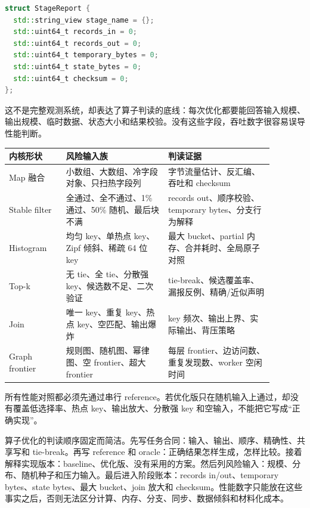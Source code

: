 \begin{lstlisting}[language=C++,caption={阶段报告的最小字段}]
struct StageReport {
  std::string_view stage_name = {};
  std::uint64_t records_in = 0;
  std::uint64_t records_out = 0;
  std::uint64_t temporary_bytes = 0;
  std::uint64_t state_bytes = 0;
  std::uint64_t checksum = 0;
};
\end{lstlisting}

这不是完整观测系统，却表达了算子判读的底线：每次优化都要能回答输入规模、输出规模、临时数据、状态大小和结果校验。没有这些字段，吞吐数字很容易误导性能判断。

\begin{center}
\begin{tabular}{p{0.19\linewidth}p{0.34\linewidth}p{0.35\linewidth}}
\toprule
内核形状 & 风险输入族 & 判读证据 \\
\midrule
Map 融合 & 小数组、大数组、冷字段对象、只扫热字段列 & 字节流量估计、反汇编、吞吐和 checksum \\
Stable filter & 全通过、全不通过、1\% 通过、50\% 随机、最后块不满 & records out、顺序校验、temporary bytes、分支行为解释 \\
Histogram & 均匀 key、单热点 key、Zipf 倾斜、稀疏 64 位 key & 最大 bucket、partial 内存、合并耗时、全局原子对照 \\
Top-k & 无 tie、全 tie、分散强 key、候选数不足、二次验证 & tie-break、候选覆盖率、漏报反例、精确/近似声明 \\
Join & 唯一 key、重复 key、热点 key、空匹配、输出爆炸 & key 频次、输出上界、实际输出、背压策略 \\
Graph frontier & 规则图、随机图、幂律图、空 frontier、超大 frontier & 每层 frontier、边访问数、重复发现数、worker 空闲时间 \\
\bottomrule
\end{tabular}
\end{center}

\begin{warningbox}
所有性能对照都必须先通过串行 reference。若优化版只在随机输入上通过，却没有覆盖低选择率、热点 key、输出放大、分散强 key 和空输入，不能把它写成“正确实现”。
\end{warningbox}

算子优化的判读顺序固定而简洁。先写任务合同：输入、输出、顺序、精确性、共享写和 tie-break。再写 reference 和 oracle：正确结果怎样生成，怎样比较。接着解释实现版本：baseline、优化版、没有采用的方案。然后列风险输入：规模、分布、随机种子和压力输入。最后进入阶段账本：records in/out、temporary bytes、state bytes、最大 bucket、join 放大和 checksum。性能数字只能放在这些事实之后，否则无法区分计算、内存、分支、同步、数据倾斜和材料化成本。

